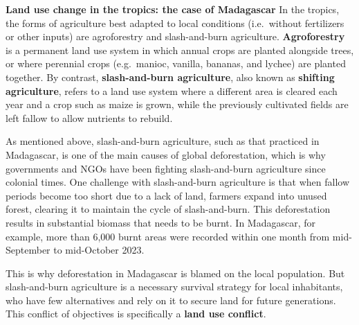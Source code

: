 \documentclass[
  a4paper,
  openany]{book}
\begin{document}
\begin{tcolorbox}[enhanced jigsaw, left=2mm, arc=.35mm, titlerule=0mm, opacityback=0, leftrule=.75mm, title={Tip}, breakable, bottomtitle=1mm, rightrule=.15mm, coltitle=black, toptitle=1mm, bottomrule=.15mm, colback=white, opacitybacktitle=0.6, colbacktitle=quarto-callout-tip-color!10!white, toprule=.15mm, colframe=quarto-callout-tip-color-frame]

\textbf{Land use change in the tropics: the case of Madagascar} In the
tropics, the forms of agriculture best adapted to local conditions
(i.e.~without fertilizers or other inputs) are agroforestry and
slash-and-burn agriculture. \textbf{Agroforestry} is a permanent land
use system in which annual crops are planted alongside trees, or where
perennial crops (e.g.~manioc, vanilla, bananas, and lychee) are planted
together. By contrast, \textbf{slash-and-burn agriculture}, also known
as \textbf{shifting agriculture}, refers to a land use system where a
different area is cleared each year and a crop such as maize is grown,
while the previously cultivated fields are left fallow to allow
nutrients to rebuild.

As mentioned above, slash-and-burn agriculture, such as that practiced
in Madagascar, is one of the main causes of global deforestation, which
is why governments and NGOs have been fighting slash-and-burn
agriculture since colonial times. One challenge with slash-and-burn
agriculture is that when fallow periods become too short due to a lack
of land, farmers expand into unused forest, clearing it to maintain the
cycle of slash-and-burn. This deforestation results in substantial
biomass that needs to be burnt. In Madagascar, for example, more than
6,000 burnt areas were recorded within one month from mid-September to
mid-October 2023.

This is why deforestation in Madagascar is blamed on the local
population. But slash-and-burn agriculture is a necessary survival
strategy for local inhabitants, who have few alternatives and rely on it
to secure land for future generations. This conflict of objectives is
specifically a \textbf{land use conflict}.

\end{tcolorbox}
\end{document}
